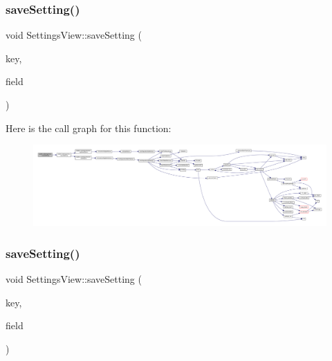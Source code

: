 \subsubsection{\texorpdfstring{save\+Setting()}{saveSetting()}\hspace{0.1cm}{\footnotesize\ttfamily [4/7]}}
{\footnotesize\ttfamily void Settings\+View\+::save\+Setting (\begin{DoxyParamCaption}\item[{const char $\ast$}]{key,  }\item[{const Q\+Line\+Edit $\ast$}]{field }\end{DoxyParamCaption})\hspace{0.3cm}{\ttfamily [private]}}

Here is the call graph for this function\+:
\nopagebreak
\begin{figure}[H]
\begin{center}
\leavevmode
\includegraphics[width=350pt]{class_q_g_b_a_1_1_settings_view_ab3dd47756c36b0dce85413846ed938ba_cgraph}
\end{center}
\end{figure}
\mbox{\label{class_q_g_b_a_1_1_settings_view_a853addf508746b4eb3f5c7ea2233c509}} 
\subsubsection{\texorpdfstring{save\+Setting()}{saveSetting()}\hspace{0.1cm}{\footnotesize\ttfamily [5/7]}}
{\footnotesize\ttfamily void Settings\+View\+::save\+Setting (\begin{DoxyParamCaption}\item[{const char $\ast$}]{key,  }\item[{const Q\+Slider $\ast$}]{field }\end{DoxyParamCaption})\hspace{0.3cm}{\ttfamily [private]}}

